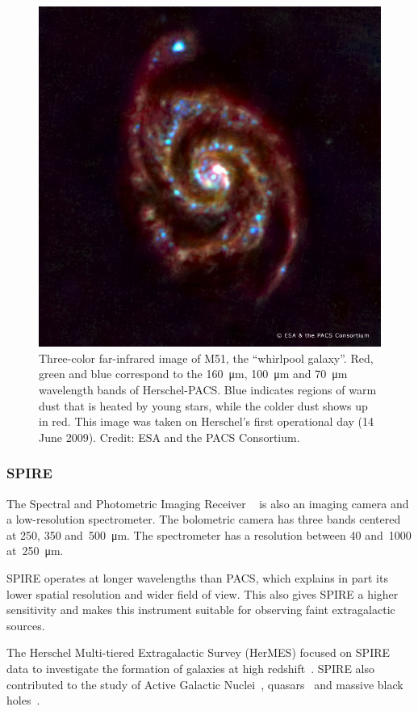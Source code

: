 \begin{figure}
    \centering
    \includegraphics[width=.6\textwidth]{m51_pacs_composite}
    \caption{
        Three-color far-infrared image of M51, the ``whirlpool galaxy''.
        Red, green and blue correspond to the \SI{160}{\micro\meter}, \SI{100}{\micro\meter} and \SI{70}{\micro\meter} wavelength bands
        of Herschel-PACS.
        Blue indicates regions of warm dust that is heated by young stars, while the colder dust shows up in red.
        This image was taken on Herschel's first operational day (14 June 2009).
        Credit: ESA and the PACS Consortium.
    }
    \label{fig:m51_pacs_composite}
\end{figure}

\subsubsection{SPIRE}
The Spectral and Photometric Imaging Receiver%
~\cite{griffin2010herschel}
is also an imaging camera and a low-resolution spectrometer.
The bolometric camera has three bands centered at \num{250}, \num{350} and~\SI{500}{\micro\meter}.
The spectrometer has a resolution between \num{40} and~\num{1000} at~\SI{250}{\micro\meter}.

SPIRE operates at longer wavelengths than PACS, which explains in part its lower spatial resolution and wider field of view.
This also gives SPIRE a higher sensitivity and makes this instrument suitable for observing faint extragalactic sources.

The Herschel Multi-tiered Extragalactic Survey (HerMES) focused on SPIRE data to investigate the formation of galaxies at high redshift~\parencite{oliver2012herschel}.
SPIRE also contributed to the study of Active Galactic Nuclei~\parencite{hatziminaoglou2010hermes}, quasars~\parencite{bonfield2011herschel} and massive black holes~\parencite{van2010black}.

